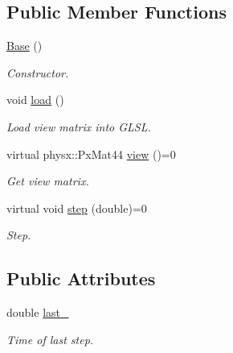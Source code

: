 \subsection*{Public Member Functions}
\begin{DoxyCompactItemize}
\item 
\hypertarget{classNeb_1_1Camera_1_1View_1_1Base_a4824e00fe745e7d7b6bef00daaf6f191}{\hyperlink{classNeb_1_1Camera_1_1View_1_1Base_a4824e00fe745e7d7b6bef00daaf6f191}{Base} ()}\label{classNeb_1_1Camera_1_1View_1_1Base_a4824e00fe745e7d7b6bef00daaf6f191}

\begin{DoxyCompactList}\small\item\em Constructor. \end{DoxyCompactList}\item 
\hypertarget{classNeb_1_1Camera_1_1View_1_1Base_a55338f0f215524b7c026fff7d08bbdcb}{void \hyperlink{classNeb_1_1Camera_1_1View_1_1Base_a55338f0f215524b7c026fff7d08bbdcb}{load} ()}\label{classNeb_1_1Camera_1_1View_1_1Base_a55338f0f215524b7c026fff7d08bbdcb}

\begin{DoxyCompactList}\small\item\em Load view matrix into G\-L\-S\-L. \end{DoxyCompactList}\item 
\hypertarget{classNeb_1_1Camera_1_1View_1_1Base_ad7609a0b61cd9fb9c54cb3b01335b764}{virtual physx\-::\-Px\-Mat44 \hyperlink{classNeb_1_1Camera_1_1View_1_1Base_ad7609a0b61cd9fb9c54cb3b01335b764}{view} ()=0}\label{classNeb_1_1Camera_1_1View_1_1Base_ad7609a0b61cd9fb9c54cb3b01335b764}

\begin{DoxyCompactList}\small\item\em Get view matrix. \end{DoxyCompactList}\item 
virtual void \hyperlink{classNeb_1_1Camera_1_1View_1_1Base_aa3c5978efc6cd916f0f91bb8def375c5}{step} (double)=0
\begin{DoxyCompactList}\small\item\em Step. \end{DoxyCompactList}\end{DoxyCompactItemize}
\subsection*{Public Attributes}
\begin{DoxyCompactItemize}
\item 
\hypertarget{classNeb_1_1Camera_1_1View_1_1Base_a931b1ed0302ee399c970740177c2e2de}{double \hyperlink{classNeb_1_1Camera_1_1View_1_1Base_a931b1ed0302ee399c970740177c2e2de}{last\-\_\-}}\label{classNeb_1_1Camera_1_1View_1_1Base_a931b1ed0302ee399c970740177c2e2de}

\begin{DoxyCompactList}\small\item\em Time of last step. \end{DoxyCompactList}\end{DoxyCompactItemize}


